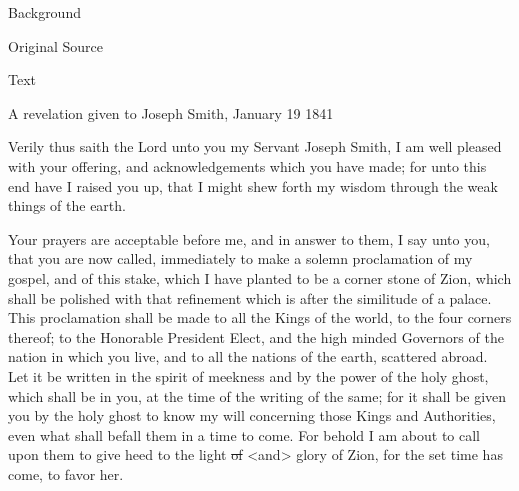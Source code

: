 			\begin{description}
				\item[Background]
			\end{description}
			
			
			\begin{description}
				\item[Original Source]
			\end{description}
			
			
			\begin{description}
				\item[Text]
			\end{description}
			
				A revelation given to Joseph Smith, January 19 1841

				Verily thus saith the Lord unto you my Servant Joseph Smith, I am well pleased with your offering, and acknowledgements which you have made; for unto this end have I raised you up, that I might shew forth my wisdom through the weak things of the earth.

				Your prayers are acceptable before me, and in answer to them, I say unto you, that you are now called, immediately to make a solemn proclamation of my gospel, and of this stake, which I have planted to be a corner stone of Zion, which shall be polished with that refinement which is after the similitude of a palace. This proclamation shall be made to all the Kings of the world, to the four corners thereof; to the Honorable President Elect, and the high minded Governors of the nation in which you live, and to all the nations of the earth, scattered abroad. Let it be written in the spirit of meekness and by the power of the holy ghost, which shall be in you, at the time of the writing of the same; for it shall be given you by the holy ghost to know my will concerning those Kings and Authorities, even what shall befall them in a time to come. For behold I am about to call upon them to give heed to the light \sout{of} <and> glory of Zion, for the set time has come, to favor her.

